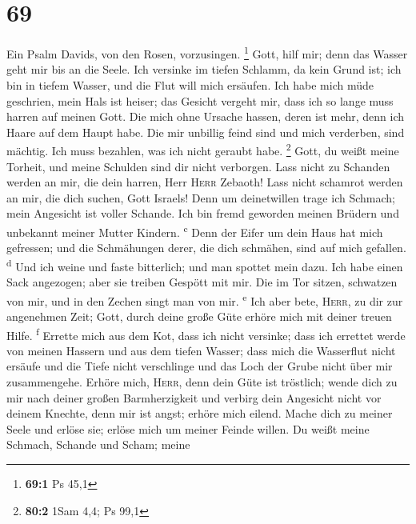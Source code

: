 \hypertarget{section-68}{%
\section{69}\label{section-68}}

 Ein Psalm Davids, von den Rosen, vorzusingen. \footnote{\textbf{69:1}
  Ps 45,1}  Gott, hilf mir; denn das Wasser geht mir bis
an die Seele.  Ich versinke im tiefen Schlamm, da kein
Grund ist; ich bin in tiefem Wasser, und die Flut will mich ersäufen.
 Ich habe mich müde geschrien, mein Hals ist heiser; das
Gesicht vergeht mir, dass ich so lange muss harren auf meinen Gott.
 Die mich ohne Ursache hassen, deren ist mehr, denn ich
Haare auf dem Haupt habe. Die mir unbillig feind sind und mich
verderben, sind mächtig. Ich muss bezahlen, was ich nicht geraubt habe.
\footnote{\textbf{80:2} 1Sam 4,4; Ps 99,1}  Gott, du weißt
meine Torheit, und meine Schulden sind dir nicht verborgen.
 Lass nicht zu Schanden werden an mir, die dein harren,
Herr \textsc{Herr} Zebaoth! Lass nicht schamrot werden an mir, die dich
suchen, Gott Israels!  Denn um deinetwillen trage ich
Schmach; mein Angesicht ist voller Schande.  Ich bin fremd
geworden meinen Brüdern und unbekannt meiner Mutter Kindern.
\textsuperscript{c}  Denn der Eifer um dein Haus hat mich
gefressen; und die Schmähungen derer, die dich schmähen, sind auf mich
gefallen. \textsuperscript{d}  Und ich weine und faste
bitterlich; und man spottet mein dazu.  Ich habe einen
Sack angezogen; aber sie treiben Gespött mit mir.  Die im
Tor sitzen, schwatzen von mir, und in den Zechen singt man von mir.
\textsuperscript{e}  Ich aber bete, \textsc{Herr}, zu dir
zur angenehmen Zeit; Gott, durch deine große Güte erhöre mich mit deiner
treuen Hilfe. \textsuperscript{f}  Errette mich aus dem
Kot, dass ich nicht versinke; dass ich errettet werde von meinen Hassern
und aus dem tiefen Wasser;  dass mich die Wasserflut
nicht ersäufe und die Tiefe nicht verschlinge und das Loch der Grube
nicht über mir zusammengehe.  Erhöre mich, \textsc{Herr},
denn dein Güte ist tröstlich; wende dich zu mir nach deiner großen
Barmherzigkeit  und verbirg dein Angesicht nicht vor
deinem Knechte, denn mir ist angst; erhöre mich eilend. 
Mache dich zu meiner Seele und erlöse sie; erlöse mich um meiner Feinde
willen.  Du weißt meine Schmach, Schande und Scham; meine
